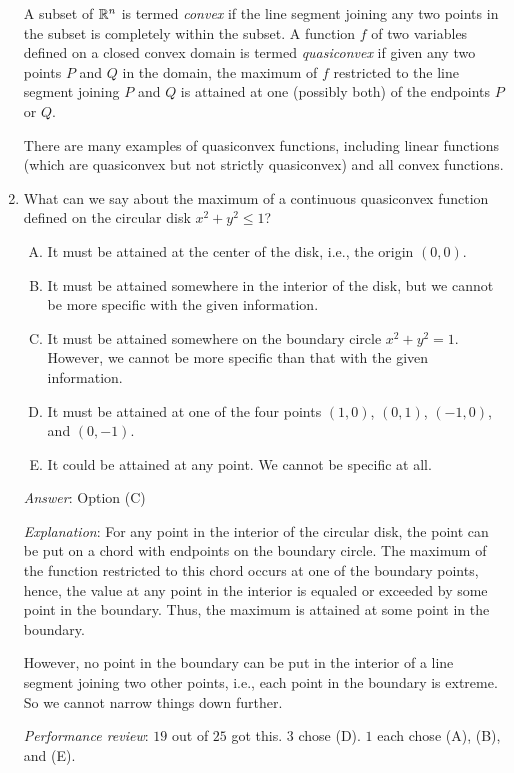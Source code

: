 \documentclass[10pt]{amsart}
\begin{document}
\begin{enumerate}
  A subset of $\mathbb{R}^n$ is termed {\em convex} if the line segment
  joining any two points in the subset is completely within the
  subset. A function $f$ of two variables defined on a closed convex
  domain is termed {\em quasiconvex} if given any two points $P$ and
  $Q$ in the domain, the maximum of $f$ restricted to the line segment
  joining $P$ and $Q$ is attained at one (possibly both) of the
  endpoints $P$ or $Q$.

  There are many examples of quasiconvex functions, including linear
  functions (which are quasiconvex but not strictly quasiconvex)
  and all convex functions.

\item What can we say about the maximum of a continuous quasiconvex
  function defined on the circular disk $x^2 + y^2 \le 1$?

  \begin{enumerate}[(A)]
  \item It must be attained at the center of the disk, i.e., the
    origin $(0,0)$.
  \item It must be attained somewhere in the interior of the disk, but
    we cannot be more specific with the given information.
  \item It must be attained somewhere on the boundary circle $x^2 +
    y^2 = 1$. However, we cannot be more specific than that with the
    given information.
  \item It must be attained at one of the four points $(1,0)$,
    $(0,1)$, $(-1,0)$, and $(0,-1)$. 
  \item It could be attained at any point. We cannot be specific at all.
  \end{enumerate}

  {\em Answer}: Option (C)

  {\em Explanation}: For any point in the interior of the circular
  disk, the point can be put on a chord with endpoints on the boundary
  circle. The maximum of the function restricted to this chord occurs
  at one of the boundary points, hence, the value at any point in the
  interior is equaled or exceeded by some point in the boundary. Thus,
  the maximum is attained at some point in the boundary.

  However, no point in the boundary can be put in the interior of a
  line segment joining two other points, i.e., each point in the
  boundary is extreme. So we cannot narrow things down further.

  {\em Performance review}: $19$ out of $25$ got this. $3$ chose
  (D). $1$ each chose (A), (B), and (E).


\end{enumerate}
\end{document}
